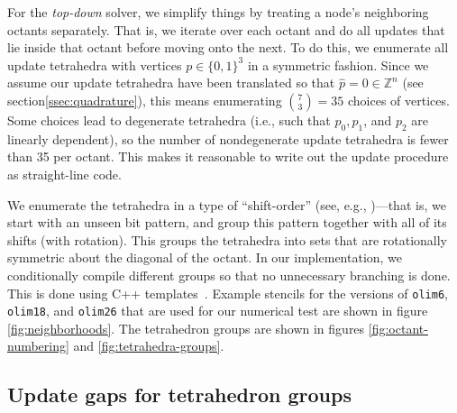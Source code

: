 \documentclass[smallcondensed]{svjour3}
\begin{document}
For the \emph{top-down} solver, we simplify things by treating a node's
neighboring octants separately. That is, we iterate over each octant
and do all updates that lie inside that octant before moving onto the
next. To do this, we enumerate all update tetrahedra with vertices
$p \in \{0, 1\}^3$ in a symmetric fashion. Since we assume our update
tetrahedra have been translated so that $\hat{p} = 0 \in \mathbb{Z}^n$
(see section\@ \ref{ssec:quadrature}), this means enumerating
${7 \choose 3} = 35$ choices of vertices. Some choices lead to
degenerate tetrahedra (i.e., such that $p_0, p_1$, and $p_2$ are
linearly dependent), so the number of nondegenerate update tetrahedra
is fewer than 35 per octant. This makes it reasonable to write out the
update procedure as straight-line code.

We enumerate the tetrahedra in a type of ``shift-order'' (see, e.g.,
\cite{arndt2010matters})---that is, we start with an unseen bit
pattern, and group this pattern together with all of its shifts (with
rotation). This groups the tetrahedra into sets that are rotationally
symmetric about the diagonal of the octant. In our implementation, we
conditionally compile different groups so that no unnecessary
branching is done. This is done using C++
templates~\cite{stroustrup2013c++}. Example stencils for the versions
of \texttt{olim6}, \texttt{olim18}, and \texttt{olim26} that are used
for our numerical test are shown in figure
\ref{fig:neighborhoods}. The tetrahedron groups are shown in figures
\ref{fig:octant-numbering} and \ref{fig:tetrahedra-groups}.

\subsection{Update gaps for tetrahedron
  groups}\label{ssec:update-gaps}
\end{document}
